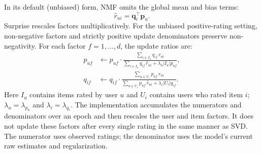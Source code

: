 \documentclass[information,article,submit,pdftex,moreauthors]{Definitions/mdpi}
\begin{document}
In its default (unbiased) form, NMF omits the global mean and bias terms:
\begin{equation}
\hat{r}_{ui} = \mathbf{q}_i^\top \mathbf{p}_u.
\end{equation}
Surprise rescales factors multiplicatively. For the unbiased positive-rating setting, non-negative factors and strictly positive update denominators preserve non-negativity. For each factor $f=1,\ldots,d$, the update ratios are:
\begin{equation}
\label{eq:nmf_updates}
\begin{aligned}
p_{uf}
&\leftarrow
p_{uf}\cdot
\frac{
\sum_{i \in I_u} q_{if}\, r_{ui}
}{
\sum_{i \in I_u} q_{if}\, \hat{r}_{ui}
+
\lambda_u \lvert I_u \rvert p_{uf}
},
\\[8pt]
q_{if}
&\leftarrow
q_{if}\cdot
\frac{
\sum_{u \in U_i} p_{uf}\, r_{ui}
}{
\sum_{u \in U_i} p_{uf}\, \hat{r}_{ui}
+
\lambda_i \lvert U_i \rvert q_{if}
}.
\end{aligned}
\end{equation}
Here $I_u$ contains items rated by user $u$ and $U_i$ contains users who rated item $i$; $\lambda_u=\lambda_{p_u}$ and $\lambda_i=\lambda_{q_i}$. The implementation accumulates the numerators and denominators over an epoch and then rescales the user and item factors. It does not update these factors after every single rating in the same manner as SVD. The numerator uses observed ratings; the denominator uses the model's current raw estimates and regularization.
\end{document}

